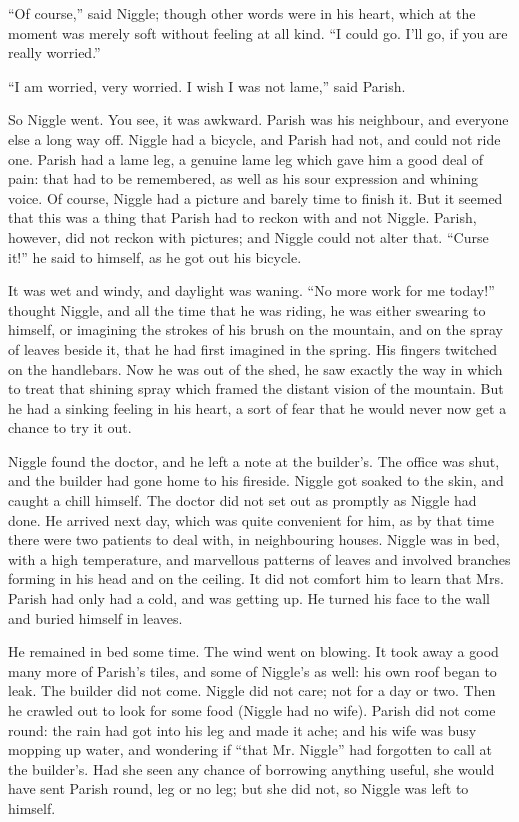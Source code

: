 \documentclass[english]{scrartcl}
\begin{document}
“Of course,” said Niggle; though other words were in his heart, which at the moment was merely soft without feeling at all kind. “I could go. I’ll go, if you are really worried.”

“I am worried, very worried. I wish I was not lame,” said Parish.

So Niggle went. You see, it was awkward. Parish was his neighbour, and everyone else a long way off. Niggle had a bicycle, and Parish had not, and could not ride one. Parish had a lame leg, a genuine lame leg which gave him a good deal of pain: that had to be remembered, as well as his sour expression and whining voice. Of course, Niggle had a picture and barely time to finish it. But it seemed that this was a thing that Parish had to reckon with and not Niggle. Parish, however, did not reckon with pictures; and Niggle could not alter that. “Curse it!” he said to himself, as he got out his bicycle.

It was wet and windy, and daylight was waning. “No more work for me today!” thought Niggle, and all the time that he was riding, he was either swearing to himself, or imagining the strokes of his brush on the mountain, and on the spray of leaves beside it, that he had first imagined in the spring. His fingers twitched on the handlebars. Now he was out of the shed, he saw exactly the way in which to treat that shining spray which framed the distant vision of the mountain. But he had a sinking feeling in his heart, a sort of fear that he would never now get a chance to try it out.

Niggle found the doctor, and he left a note at the builder’s. The office was shut, and the builder had gone home to his fireside. Niggle got soaked to the skin, and caught a chill himself. The doctor did not set out as promptly as Niggle had done. He arrived next day, which was quite convenient for him, as by that time there were two patients to deal with, in neighbouring houses. Niggle was in bed, with a high temperature, and marvellous patterns of leaves and involved branches forming in his head and on the ceiling. It did not comfort him to learn that Mrs. Parish had only had a cold, and was getting up. He turned his face to the wall and buried himself in leaves.

He remained in bed some time. The wind went on blowing. It took away a good many more of Parish’s tiles, and some of Niggle’s as well: his own roof began to leak. The builder did not come. Niggle did not care; not for a day or two. Then he crawled out to look for some food (Niggle had no wife). Parish did not come round: the rain had got into his leg and made it ache; and his wife was busy mopping up water, and wondering if “that Mr. Niggle” had forgotten to call at the builder’s. Had she seen any chance of borrowing anything useful, she would have sent Parish round, leg or no leg; but she did not, so Niggle was left to himself.
\end{document}
